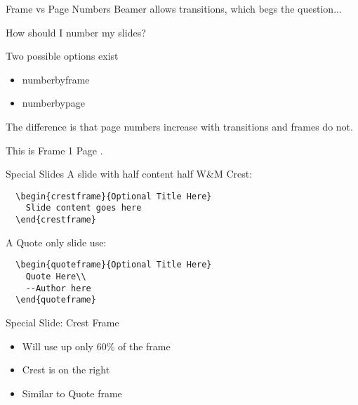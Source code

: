 \documentclass[xcolor=table,compress,pdfpagelabels]{beamer}
\begin{document}
\begin{frame}[fragile]{Frame vs Page Numbers}
Beamer allows transitions, which begs the question...\\
\begin{block}{}
\begin{center}How should I number my slides?\end{center}
\end{block}
Two possible options exist
\begin{itemize}
  \item numberbyframe
  \item numberbypage 
\end{itemize}
The difference is that page numbers \alert{increase} with transitions and frames do not.
\begin{example}
\begin{center}
This is Frame \alert{1} Page \alert{}.
\end{center}
\end{example}
\end{frame}

\begin{frame}[fragile]{Special Slides}
 A slide with half content half W\&M Crest:
  \begin{verbatim}
  \begin{crestframe}{Optional Title Here}
    Slide content goes here
  \end{crestframe}
  \end{verbatim}
 
  A Quote only slide use:
  \begin{verbatim}
  \begin{quoteframe}{Optional Title Here}
    Quote Here\\
    --Author here
  \end{quoteframe}
  \end{verbatim}
\end{frame}

\begin{crestframe}{Special Slide: Crest Frame}
\begin{itemize}
\item Will use up only 60\% of the frame
\item Crest is on the right
\item Similar to Quote frame
\end{itemize}
\end{crestframe}
\end{document}
